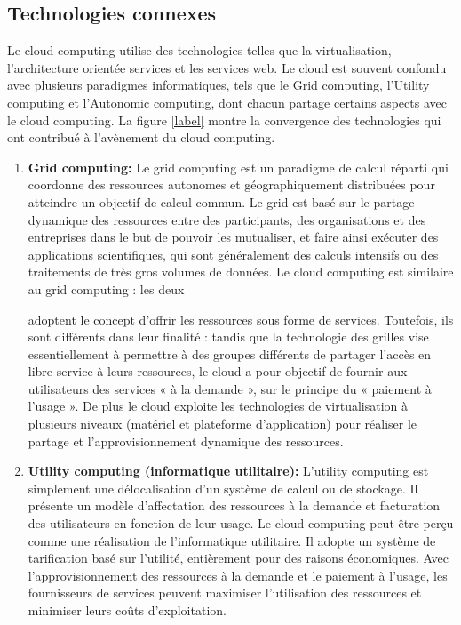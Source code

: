 \subsection{Technologies connexes }
Le cloud computing  utilise des technologies telles que la virtualisation, l'architecture orientée services et les services web. Le cloud est souvent confondu avec plusieurs paradigmes informatiques, tels que le Grid computing, l’Utility computing  et l’Autonomic computing, dont chacun partage certains aspects avec le cloud computing. La figure \ref{label} montre la convergence des technologies qui ont contribué à l'avènement du cloud computing. 
\begin{enumerate}
\item \textbf{Grid computing: }   Le grid computing  est un paradigme de calcul réparti qui coordonne des ressources autonomes et géographiquement distribuées pour atteindre un objectif de calcul commun. Le grid est basé sur le partage dynamique des ressources entre des participants, des organisations et des entreprises dans le but de pouvoir les mutualiser, et faire ainsi exécuter des applications scientifiques, qui sont généralement des calculs intensifs ou des traitements de très gros volumes de données. Le cloud computing  est similaire au grid computing : les deux 

adoptent le concept d’offrir les  ressources sous forme de services. Toutefois, ils sont différents dans leur finalité : tandis que la technologie des grilles vise essentiellement à permettre à des groupes différents de partager l’accès en libre service à leurs ressources, le cloud a pour objectif de fournir aux utilisateurs des services « à la demande », sur le principe du « paiement à l’usage ». De plus le cloud  exploite les technologies de virtualisation à plusieurs niveaux (matériel et plateforme d'application) pour réaliser le partage et l'approvisionnement dynamique des ressources.  
\item \textbf{Utility computing  (informatique utilitaire): } L’utility computing  est simplement une délocalisation d'un système de calcul ou de stockage. Il présente un modèle d’affectation des ressources à la demande et facturation des utilisateurs en fonction de leur usage. Le cloud computing  peut être perçu comme une réalisation de l'informatique utilitaire. Il adopte un système de tarification basé sur l'utilité, entièrement pour des raisons économiques. Avec l'approvisionnement des ressources à la demande et le paiement à l’usage, les fournisseurs de services peuvent maximiser l'utilisation des ressources et minimiser leurs coûts d'exploitation.


\end{enumerate}
